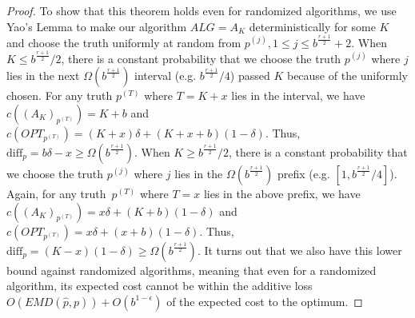 \begin{proof}
    To show that this theorem holds even for randomized algorithms, we use Yao's Lemma to make our algorithm $ALG=A_K$ deterministically for some $K$ and choose the truth uniformly at random from $p^{(j)}, 1 \leq j \leq b^{\frac{r+1}{2}}+2$. When $K \leq b^{\frac{r+1}{2}}/2$, there is a constant probability that we choose the truth $p^{(j)}$ where $j$ lies in the next $\Omega(b^{\frac{r+1}{2}})$ interval (e.g. $b^{\frac{r+1}{2}}/4$) passed $K$ because of the uniformly chosen. For any truth $p^{(T)}$ where $T=K+x$ lies in the interval, we have $c((A_K)_{p^{(T)}})=K+b$ and $c(OPT_{p^{(T)}}) = (K+x)\delta+(K+x+b)(1-\delta)$. Thus, $\text{diff}_p =b\delta - x \geq \Omega(b^{\frac{r+1}{2}})$. When $K \geq b^{\frac{r+1}{2}}/2$, there is a constant probability that we choose the truth $p^{(j)}$ where $j$ lies in the $\Omega(b^{\frac{r+1}{2}})$ prefix (e.g. $[1,b^{\frac{r+1}{2}}/4]$). Again, for any truth~$p^{(T)}$ where $T=x$ lies in the above prefix, we have $c((A_K)_{p^{(T)}})=x\delta+(K+b)(1-\delta)$ and $c(OPT_{p^{(T)}}) = x\delta+(x+b)(1-\delta)$. Thus, $\text{diff}_p =(K-x)(1-\delta) \geq \Omega(b^{\frac{r+1}{2}})$. It turns out that we also have this lower bound against randomized algorithms, meaning that even for a randomized algorithm, its expected cost cannot be within the additive loss $O(EMD(\hat{p},p))+O(b^{1-\epsilon})$ of the expected cost to the optimum. 
\end{proof}

